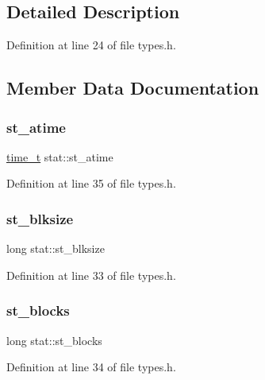 \subsection{Detailed Description}


Definition at line 24 of file types.\+h.



\subsection{Member Data Documentation}
\mbox{\label{structstat_ab74d1e7e345e88b9d0fb2688a97cba64}} 
\subsubsection{\texorpdfstring{st\_atime}{st\_atime}}
{\footnotesize\ttfamily \mbox{\hyperlink{time_8h_aec517130c026730881898750d76e596f}{time\+\_\+t}} stat\+::st\+\_\+atime}



Definition at line 35 of file types.\+h.

\mbox{\label{structstat_a44c8d9651d7fd08e741f325a81b7beb7}} 
\subsubsection{\texorpdfstring{st\_blksize}{st\_blksize}}
{\footnotesize\ttfamily long stat\+::st\+\_\+blksize}



Definition at line 33 of file types.\+h.

\mbox{\label{structstat_a633f6f479042b721792de917108228e9}} 
\subsubsection{\texorpdfstring{st\_blocks}{st\_blocks}}
{\footnotesize\ttfamily long stat\+::st\+\_\+blocks}



Definition at line 34 of file types.\+h.

\mbox{\label{structstat_a1b4b858db1ebe79c3d6e0fc1ef721024}} 
